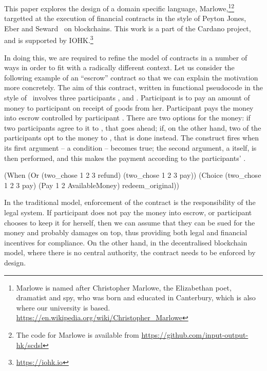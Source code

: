 \documentclass[runningheads]{llncs}
\begin{document}
This paper explores the design of a domain specific language, Marlowe,\footnote{Marlowe is named after Christopher 
Marlowe, the Elizabethan poet, dramatist and spy, who was born and educated in Canterbury, which is also where our 
university is based. \url{https://en.wikipedia.org/wiki/Christopher_Marlowe}}\footnote{The code for Marlowe is available 
from \url{https://github.com/input-output-hk/scdsl}} targetted at the execution of financial contracts in the style of 
Peyton Jones, Eber and Seward~\cite{PeytonJones:2000} on blockchains. This work is a part of the Cardano project, and is 
supported by IOHK.\footnote{\url{https://iohk.io}}

In doing this, we are required to refine the model of contracts in a number of ways in order to fit with a radically 
different context. Let us consider the following example of an ``escrow'' contract so that we can explain the motivation 
more concretely. The aim of this contract, written in functional pseudocode in the style of~\cite{PeytonJones:2000} 
involves three participants ,  and . Participant  is 
to pay an amount of money to participant  on receipt of goods from her. Participant  
pays the money into escrow controlled by participant . There are two options for the money: if two 
participants agree to  it to , that goes ahead; if, on the other hand, two of the 
participants opt to  the money to , that is done instead. The 
 construct fires when its first argument -- a condition -- becomes true; the second argument, a 
 itself, is then performed, and this makes the payment according to the participants' 
.

\begin{haskellcode}
(When (Or (two_chose 1 2 3 refund)
          (two_chose 1 2 3 pay))
      (Choice (two_chose 1 2 3 pay)
              (Pay 1 2 AvailableMoney)
              redeem_original))
\end{haskellcode}

In the traditional model, enforcement of the contract is the responsibility of the legal system. If participant 
 does not pay the money into escrow, or participant  chooses to keep it for herself, 
then we can assume that they can be sued for the money and probably damages on top, thus providing both legal and 
financial incentives for compliance. On the other hand, in the decentralised blockchain model, where there is no central 
authority, the contract needs to be enforced by design. 
\end{document}
